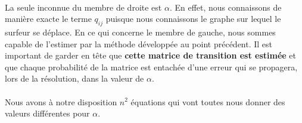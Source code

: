 \documentclass[a4paper,titlepage]{report}
\begin{document}
\paragraph{}
La seule inconnue du membre de droite est $\alpha$. En effet, nous connaissons de manière exacte le terme $q_{ij}$ puisque nous connaissons le graphe sur lequel le surfeur se déplace. En ce qui concerne le membre de gauche, nous sommes capable de l'estimer par la méthode développée au point précédent. Il est important de garder en tête que \textbf{cette matrice de transition est estimée} et que chaque probabilité de la matrice est entachée d'une erreur qui se propagera, lors de la résolution, dans la valeur de $\alpha$. 
\paragraph{}
Nous avons à notre disposition $n^2$ équations qui vont toutes nous donner des valeurs différentes pour $\alpha$. 
\end{document}
